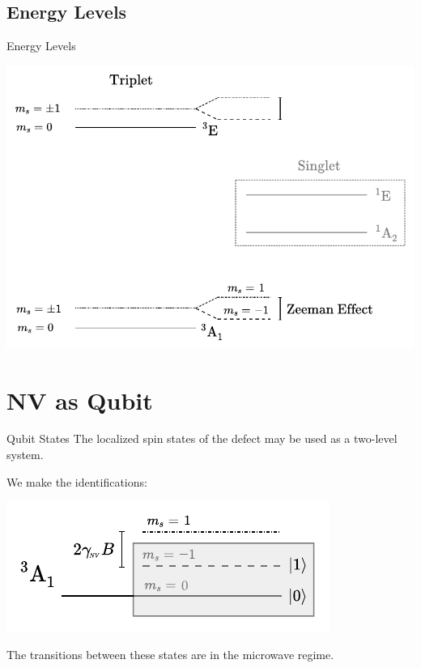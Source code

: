 \documentclass[11pt]{beamer}
\begin{document}
\subsection{Energy Levels}
\begin{frame}{Energy Levels}
\begin{center}
\includegraphics[scale=0.76]{energy_raw.pdf}
\end{center}
\vspace{0.7cm}
\end{frame}

\section{NV as Qubit}

\begin{frame}{Qubit States}
The localized spin states of the defect may be used as a two-level system.\pause

\vspace{.4cm}

We make the identifications:

\begin{center}
\includegraphics[scale=1.3]{energy_qubit.pdf}
\end{center}\pause

The transitions between these states are in the microwave regime.
\end{frame}
\end{document}
